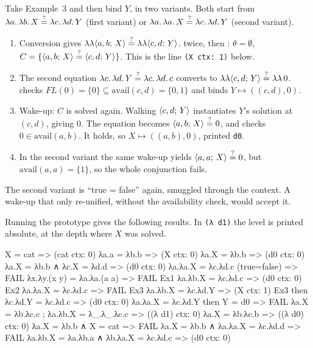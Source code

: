 \begin{tutorial}
Take Example~3 and then bind $Y$, in two variants. Both start from
$\lambda a.\,\lambda b.\,X\stackrel{?}{=}\lambda c.\,\lambda d.\,Y$ (first variant) or
$\lambda a.\,\lambda a.\,X\stackrel{?}{=}\lambda c.\,\lambda d.\,Y$ (second variant).
\begin{enumerate}
  \item Conversion gives $\lambda\lambda\langle a,b;\,X\rangle\stackrel{?}{=}\lambda\lambda\langle c,d;\,Y\rangle$. 
    twice, then : $\theta=\emptyset$, $C=\{\langle a,b;\,X\rangle\stackrel{?}{=}\langle c,d;\,Y\rangle\}$. This is the
    line \texttt{(X ctx: 1)} below.
  \item The second equation $\lambda c.\,\lambda d.\,Y\stackrel{?}{=}\lambda c.\,\lambda d.\,c$ converts to
    $\lambda\lambda\langle c,d;\,Y\rangle\stackrel{?}{=}\lambda\lambda\,0$.  checks
    $FL(0)=\{0\}\subseteq\mathrm{avail}(c,d)=\{0,1\}$ and binds $Y\mapsto((c,d),0)$.
  \item Wake-up: $C$ is solved again. Walking $\langle c,d;\,Y\rangle$ instantiates $Y$'s solution at
    $(c,d)$, giving $0$. The equation becomes $\langle a,b;\,X\rangle\stackrel{?}{=} 0$, and  checks
    $0\in\mathrm{avail}(a,b)$. It holds, so $X\mapsto((a,b),0)$, printed \texttt{d0}.
  \item In the second variant the same wake-up yields $\langle a,a;\,X\rangle\stackrel{?}{=} 0$, but
    $\mathrm{avail}(a,a)=\{1\}$, so the whole conjunction fails.
\end{enumerate}
The second variant is \enquote{true = false} again, smuggled through the context. A wake-up that only
re-unified, without the availability check, would accept it.
\end{tutorial}

Running the prototype gives the following results. In \texttt{(λ d1)} the level is printed absolute,
at the depth where $X$ was solved.

\begin{answers}
X = cat                               => (cat ctx: 0)
λa.a = λb.b                           => (X ctx: 0)
λa.X = λb.b                           => (d0 ctx: 0)
λa.X = λb.b ∧ λc.X = λd.d             => (d0 ctx: 0)
λa.λa.X = λc.λd.c  (true=false)       => FAIL
λx.λy.(x y) = λa.λa.(a a)             => FAIL
Ex1 λa.λb.X = λc.λd.c                 => (d0 ctx: 0)
Ex2 λa.λa.X = λc.λd.c                 => FAIL
Ex3 λa.λb.X = λc.λd.Y                 => (X ctx: 1)
Ex3 then λc.λd.Y = λc.λd.c            => (d0 ctx: 0)
λa.λa.X = λc.λd.Y then Y = d0         => FAIL
λa.X = λb.λc.c ; λa.λb.X = λ_.λ_.λc.c => ((λ d1) ctx: 0)
λa.X = λb.λc.b                        => ((λ d0) ctx: 0)
λa.X = λb.b ∧ X = cat                 => FAIL
λa.X = λb.b ∧ λa.λa.X = λc.λd.d       => FAIL
λa.λb.X = λa.λb.a ∧ λb.λa.X = λc.λd.c => (d0 ctx: 0)
\end{answers}

